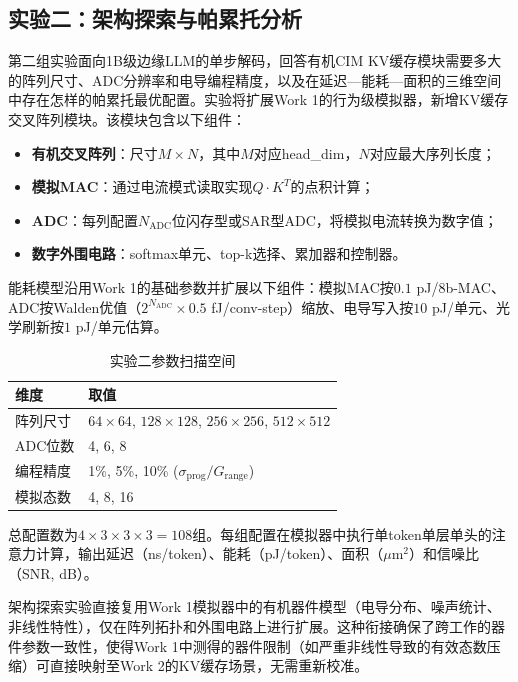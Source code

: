 \subsection{实验二：架构探索与帕累托分析}
\label{sec:exp2_arch}

第二组实验面向1B级边缘LLM的单步解码，回答有机CIM KV缓存模块需要多大的阵列尺寸、ADC分辨率和电导编程精度，以及在延迟—能耗—面积的三维空间中存在怎样的帕累托最优配置。实验将扩展Work 1的行为级模拟器，新增KV缓存交叉阵列模块。该模块包含以下组件：

\begin{itemize}
    \item \textbf{有机交叉阵列}：尺寸$M \times N$，其中$M$对应head\_dim，$N$对应最大序列长度；
    \item \textbf{模拟MAC}：通过电流模式读取实现$Q \cdot K^T$的点积计算；
    \item \textbf{ADC}：每列配置$N_{\text{ADC}}$位闪存型或SAR型ADC，将模拟电流转换为数字值；
    \item \textbf{数字外围电路}：softmax单元、top-k选择、累加器和控制器。
\end{itemize}

能耗模型沿用Work 1的基础参数并扩展以下组件：模拟MAC按$0.1$ pJ/8b-MAC、ADC按Walden优值（$2^{N_{\text{ADC}}} \times 0.5$ fJ/conv-step）缩放、电导写入按$10$ pJ/单元、光学刷新按$1$ pJ/单元估算。

\begin{table}[htbp]
\centering
\caption{实验二参数扫描空间}
\label{tab:exp2_grid}
\begin{tabular}{ll}
\toprule
维度 & 取值 \\
\midrule
阵列尺寸 & $64\times64$, $128\times128$, $256\times256$, $512\times512$ \\
ADC位数 & 4, 6, 8 \\
编程精度 & 1\%, 5\%, 10\% ($\sigma_{\text{prog}} / G_{\text{range}}$) \\
模拟态数 & 4, 8, 16 \\
\bottomrule
\end{tabular}
\end{table}

总配置数为$4 \times 3 \times 3 \times 3 = 108$组。每组配置在模拟器中执行单token单层单头的注意力计算，输出延迟（ns/token）、能耗（pJ/token）、面积（$\mu$m$^2$）和信噪比（SNR, dB）。

架构探索实验直接复用Work 1模拟器中的有机器件模型（电导分布、噪声统计、非线性特性），仅在阵列拓扑和外围电路上进行扩展。这种衔接确保了跨工作的器件参数一致性，使得Work 1中测得的器件限制（如严重非线性导致的有效态数压缩）可直接映射至Work 2的KV缓存场景，无需重新校准。

